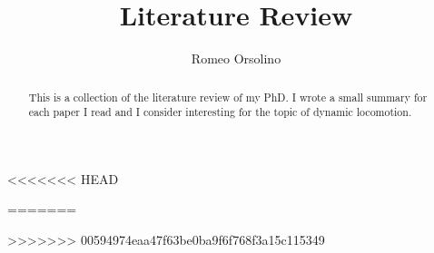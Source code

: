 \documentclass{article}
\begin{document}
\title{Literature Review}
\author{Romeo Orsolino}

\maketitle
\tableofcontents
\begin{abstract}
This is a collection of the literature review of my PhD. I wrote a small summary for each paper I read and I consider interesting for the topic of dynamic locomotion.
\end{abstract}
















<<<<<<< HEAD


=======


>>>>>>> 00594974eaa47f63be0ba9f6f768f3a15c115349





\end{document}
